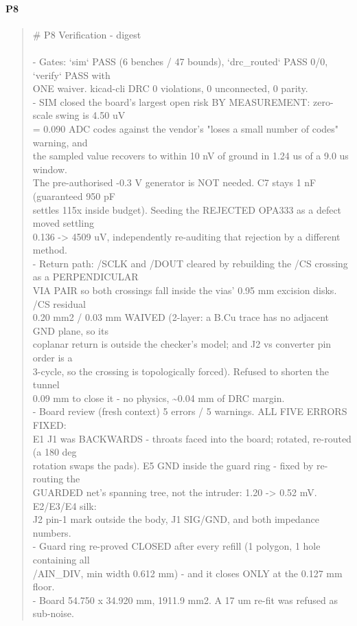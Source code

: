 \documentclass[11pt,a4paper]{article}
\begin{document}
\paragraph*{P8}
\begin{quote}\small\ttfamily\raggedright
\# P8 Verification - digest\\
~\\
- Gates: `sim` PASS (6 benches / 47 bounds), `drc\_routed` PASS 0/0, `verify` PASS with\\
  ONE waiver. kicad-cli DRC 0 violations, 0 unconnected, 0 parity.\\
- SIM closed the board's largest open risk BY MEASUREMENT: zero-scale swing is 4.50 uV\\
  = 0.090 ADC codes against the vendor's "loses a small number of codes" warning, and\\
  the sampled value recovers to within 10 nV of ground in 1.24 us of a 9.0 us window.\\
  The pre-authorised -0.3 V generator is NOT needed. C7 stays 1 nF (guaranteed 950 pF\\
  settles 115x inside budget). Seeding the REJECTED OPA333 as a defect moved settling\\
  0.136 -\textgreater{} 4509 uV, independently re-auditing that rejection by a different method.\\
- Return path: /SCLK and /DOUT cleared by rebuilding the /CS crossing as a PERPENDICULAR\\
  VIA PAIR so both crossings fall inside the vias' 0.95 mm excision disks. /CS residual\\
  0.20 mm2 / 0.03 mm WAIVED (2-layer: a B.Cu trace has no adjacent GND plane, so its\\
  coplanar return is outside the checker's model; and J2 vs converter pin order is a\\
  3-cycle, so the crossing is topologically forced). Refused to shorten the tunnel\\
  0.09 mm to close it - no physics, \textasciitilde{}0.04 mm of DRC margin.\\
- Board review (fresh context) 5 errors / 5 warnings. ALL FIVE ERRORS FIXED:\\
  E1 J1 was BACKWARDS - throats faced into the board; rotated, re-routed (a 180 deg\\
  rotation swaps the pads). E5 GND inside the guard ring - fixed by re-routing the\\
  GUARDED net's spanning tree, not the intruder: 1.20 -\textgreater{} 0.52 mV. E2/E3/E4 silk:\\
  J2 pin-1 mark outside the body, J1 SIG/GND, and both impedance numbers.\\
- Guard ring re-proved CLOSED after every refill (1 polygon, 1 hole containing all\\
  /AIN\_DIV, min width 0.612 mm) - and it closes ONLY at the 0.127 mm floor.\\
- Board 54.750 x 34.920 mm, 1911.9 mm2. A 17 um re-fit was refused as sub-noise.
\end{quote}
\end{document}
